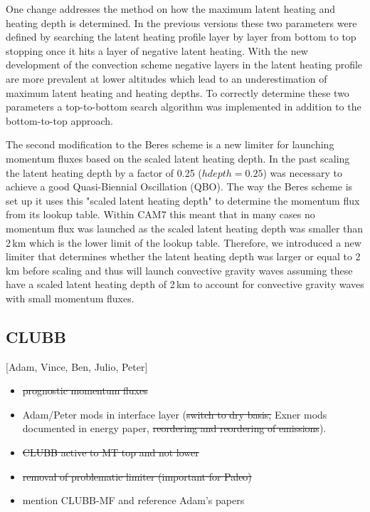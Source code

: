 \documentclass[draft]{agujournal2019}
\begin{document}
One change addresses the method on how the maximum latent heating and heating depth is determined. In the previous versions these two parameters were defined by searching the latent heating profile layer by layer from bottom to top stopping once it hits a layer of negative latent heating. With the new development of the convection scheme negative layers in the latent heating profile are more prevalent at lower altitudes which lead to an underestimation of maximum latent heating and heating depths. To correctly determine these two parameters a top-to-bottom search algorithm was implemented in addition to the bottom-to-top approach. 

The second modification to the Beres scheme is a new limiter for launching momentum fluxes based on the scaled latent heating depth. In the past scaling the latent heating depth by a factor of 0.25 ($hdepth = 0.25$) was necessary to achieve a good Quasi-Biennial Oscillation (QBO). The way the Beres scheme is set up it uses this "scaled latent heating depth" to determine the momentum flux from its lookup table. Within CAM7 this meant that in many cases no momentum flux was launched as the scaled latent heating depth was smaller than 2\,km which is the lower limit of the lookup table. Therefore, we introduced a new limiter that determines whether the latent heating depth was larger or equal to 2\,km before scaling and thus will launch convective gravity waves assuming these have a scaled latent heating depth of 2\,km to account for convective gravity waves with small momentum fluxes. 


 \subsection{CLUBB}
 [Adam, Vince, Ben, Julio, Peter]
 \begin{itemize}
     \item \st{prognostic momentum fluxes}
     \item Adam/Peter mods in interface layer (\st{switch to dry basis,} Exner mods documented in energy paper, \st{reordering and reordering of emissions}).
     \item \st{CLUBB active to MT top and not lower} {\color{blue}{I think this is the same as problematic limiter below?}}
     \item \st{removal of problematic limiter (important for Paleo)} 
     \item mention CLUBB-MF and reference Adam's papers
 \end{itemize}
\end{document}
